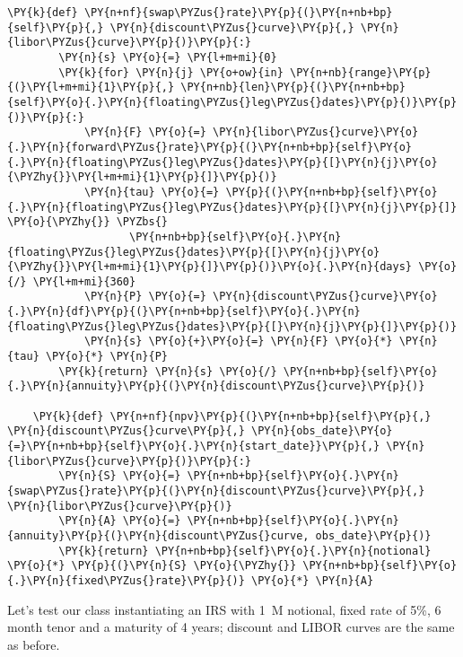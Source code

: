 \begin{codebox}[breakable, size=fbox, boxrule=1pt, pad at break*=1mm,colback=cellbackground, colframe=cellborder]
\begin{Verbatim}[commandchars=\\\{\}]
    \PY{k}{def} \PY{n+nf}{swap\PYZus{}rate}\PY{p}{(}\PY{n+nb+bp}{self}\PY{p}{,} \PY{n}{discount\PYZus{}curve}\PY{p}{,} \PY{n}{libor\PYZus{}curve}\PY{p}{)}\PY{p}{:}
        \PY{n}{s} \PY{o}{=} \PY{l+m+mi}{0}
        \PY{k}{for} \PY{n}{j} \PY{o+ow}{in} \PY{n+nb}{range}\PY{p}{(}\PY{l+m+mi}{1}\PY{p}{,} \PY{n+nb}{len}\PY{p}{(}\PY{n+nb+bp}{self}\PY{o}{.}\PY{n}{floating\PYZus{}leg\PYZus{}dates}\PY{p}{)}\PY{p}{)}\PY{p}{:}
            \PY{n}{F} \PY{o}{=} \PY{n}{libor\PYZus{}curve}\PY{o}{.}\PY{n}{forward\PYZus{}rate}\PY{p}{(}\PY{n+nb+bp}{self}\PY{o}{.}\PY{n}{floating\PYZus{}leg\PYZus{}dates}\PY{p}{[}\PY{n}{j}\PY{o}{\PYZhy{}}\PY{l+m+mi}{1}\PY{p}{]}\PY{p}{)}
            \PY{n}{tau} \PY{o}{=} \PY{p}{(}\PY{n+nb+bp}{self}\PY{o}{.}\PY{n}{floating\PYZus{}leg\PYZus{}dates}\PY{p}{[}\PY{n}{j}\PY{p}{]} \PY{o}{\PYZhy{}} \PYZbs{}
                   \PY{n+nb+bp}{self}\PY{o}{.}\PY{n}{floating\PYZus{}leg\PYZus{}dates}\PY{p}{[}\PY{n}{j}\PY{o}{\PYZhy{}}\PY{l+m+mi}{1}\PY{p}{]}\PY{p}{)}\PY{o}{.}\PY{n}{days} \PY{o}{/} \PY{l+m+mi}{360}
            \PY{n}{P} \PY{o}{=} \PY{n}{discount\PYZus{}curve}\PY{o}{.}\PY{n}{df}\PY{p}{(}\PY{n+nb+bp}{self}\PY{o}{.}\PY{n}{floating\PYZus{}leg\PYZus{}dates}\PY{p}{[}\PY{n}{j}\PY{p}{]}\PY{p}{)}
            \PY{n}{s} \PY{o}{+}\PY{o}{=} \PY{n}{F} \PY{o}{*} \PY{n}{tau} \PY{o}{*} \PY{n}{P}
        \PY{k}{return} \PY{n}{s} \PY{o}{/} \PY{n+nb+bp}{self}\PY{o}{.}\PY{n}{annuity}\PY{p}{(}\PY{n}{discount\PYZus{}curve}\PY{p}{)}
        
    \PY{k}{def} \PY{n+nf}{npv}\PY{p}{(}\PY{n+nb+bp}{self}\PY{p}{,} \PY{n}{discount\PYZus{}curve\PY{p}{,} \PY{n}{obs_date}\PY{o}{=}\PY{n+nb+bp}{self}\PY{o}{.}\PY{n}{start_date}}\PY{p}{,} \PY{n}{libor\PYZus{}curve}\PY{p}{)}\PY{p}{:}
        \PY{n}{S} \PY{o}{=} \PY{n+nb+bp}{self}\PY{o}{.}\PY{n}{swap\PYZus{}rate}\PY{p}{(}\PY{n}{discount\PYZus{}curve}\PY{p}{,} \PY{n}{libor\PYZus{}curve}\PY{p}{)}
        \PY{n}{A} \PY{o}{=} \PY{n+nb+bp}{self}\PY{o}{.}\PY{n}{annuity}\PY{p}{(}\PY{n}{discount\PYZus{}curve, obs_date}\PY{p}{)}
        \PY{k}{return} \PY{n+nb+bp}{self}\PY{o}{.}\PY{n}{notional} \PY{o}{*} \PY{p}{(}\PY{n}{S} \PY{o}{\PYZhy{}} \PY{n+nb+bp}{self}\PY{o}{.}\PY{n}{fixed\PYZus{}rate}\PY{p}{)} \PY{o}{*} \PY{n}{A}
\end{Verbatim}
\end{codebox}

Let's test our class instantiating an IRS with 1~M notional, fixed rate
of 5\%, 6 month tenor and a maturity of 4 years; discount and LIBOR
curves are the same as before.

